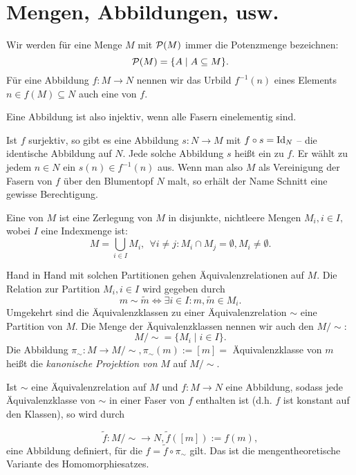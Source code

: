\documentclass[12pt]{scrbook}   %
\begin{document}
\section{Mengen, Abbildungen, usw.}

Wir werden für eine Menge $M$ mit ${\cal P}(M)$ immer die Potenzmenge 
bezeichnen: 
$${\cal P}(M) = \{A \mid A\subseteq M\}.$$
Für eine Abbildung $f:M\longrightarrow N$ nennen wir das Urbild
$f^{-1}(n)$ eines Elements $n\in f(M)\subseteq N$ auch eine 
 von $f.$

Eine Abbildung ist also injektiv, wenn alle Fasern  einelementig sind.

Ist $f$ surjektiv, so gibt es eine Abbildung $s:N\longrightarrow M$ mit
$f\circ s = {\rm Id}_N$ -- die identische Abbildung auf $N.$ Jede solche 
Abbildung $s$ heißt ein  zu $f$. Er wählt zu 
jedem $n\in N$ ein $s(n)\in f^{-1}(n)$ aus. Wenn man also $M$ als Vereinigung
der Fasern von $f$ über den Blumentopf $N$ malt, so erhält der Name Schnitt
eine gewisse Berechtigung.

Eine  von $M$ ist eine Zerlegung von $M$ in 
disjunkte, nichtleere Mengen $M_i,i\in I,$ wobei $I$ eine Indexmenge ist:
$$M=\bigcup_{i\in I} M_i,\ \ \forall i\neq j: M_i\cap M_j = \emptyset, 
M_i\neq\emptyset.$$

Hand in Hand mit solchen Partitionen gehen \"Aquivalenzrelationen auf $M.$
Die Relation zur Partition $M_i,i\in I$ wird gegeben durch
$$m\sim \tilde m \iff \exists i\in I: m,\tilde m\in M_i.$$
Umgekehrt sind die \"Aquivalenzklassen zu einer \"Aquivalenzrelation $\sim $ 
eine Partition von $M.$ Die Menge der \"Aquivalenzklassen nennen wir auch den
 $M/\sim$:
$$M/\sim = \{M_i\mid i\in I\}.$$
Die Abbildung $\pi_\sim: M\longrightarrow M/\sim, \pi_\sim(m):= [m] = $ 
\"Aquivalenzklasse von $m$ heißt die {\it kanonische Projektion von } $M$ 
auf $M/\sim$.

Ist $\sim$ eine \"Aquivalenzrelation auf $M$ und $f:M\longrightarrow N$ eine
Abbildung, sodass
jede \"Aquivalenzklasse von $\sim$ in einer Faser von $f$ enthalten ist (d.h.
$f$ ist konstant auf den Klassen), so wird durch 

$$\tilde f:M/\sim \longrightarrow N, \tilde f([m]) := f(m),$$
eine Abbildung definiert, für die $f=\tilde f \circ \pi_\sim$ gilt. Das ist
die mengentheoretische Variante des Homomorphiesatzes.
\end{document}
